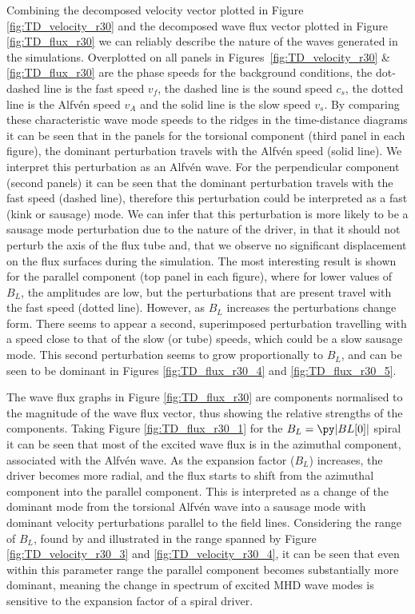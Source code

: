 Combining the decomposed velocity vector plotted in Figure \ref{fig:TD_velocity_r30} and the decomposed wave flux vector plotted in Figure \ref{fig:TD_flux_r30} we can reliably describe the nature of the waves generated in the simulations.
Overplotted on all panels in Figures~\ref{fig:TD_velocity_r30} \& \ref{fig:TD_flux_r30} are the phase speeds for the background conditions, the dot-dashed line is the fast speed $v_f$, the dashed line is the sound speed $c_s$, the dotted line is the Alfv\'en speed $v_A$ and the solid line is the slow speed $v_s$.
By comparing these characteristic wave mode speeds to the ridges in the time-distance diagrams it can be seen that in the panels for the torsional component (third panel in each figure), the dominant perturbation travels with the Alfv\'en speed (solid line).
We interpret this perturbation as an Alfv\'en wave.
For the perpendicular component (second panels) it can be seen that the dominant perturbation travels with the fast speed (dashed line), therefore this perturbation could be interpreted as a fast (kink or sausage) mode.
We can infer that this perturbation is more likely to be a sausage mode perturbation due to the nature of the driver, in that it should not perturb the axis of the flux tube and, that we observe no significant displacement on the flux surfaces during the simulation.
The most interesting result is shown for the parallel component (top panel in each figure), where for lower values of $B_L$, the amplitudes are low, but the perturbations that are present travel with the fast speed (dotted line).
However, as $B_L$ increases the perturbations change form.
There seems to appear a second, superimposed perturbation travelling with a speed close to that of the slow (or tube) speeds, which could be a slow sausage mode.
This second perturbation seems to grow proportionally to $B_L$, and can be seen to be dominant in Figures \ref{fig:TD_flux_r30_4} and \ref{fig:TD_flux_r30_5}.

The wave flux graphs in Figure \ref{fig:TD_flux_r30} are components normalised to the magnitude of the wave flux vector, thus showing the relative strengths of the components.
Taking Figure \ref{fig:TD_flux_r30_1} for the $B_L=\py|BL[0]|$ spiral it can be seen that most of the excited wave flux is in the azimuthal component, associated with the Alfv\'en wave.
As the expansion factor ($B_L$) increases, the driver becomes more radial, and the flux starts to shift from the azimuthal component into the parallel component.
This is interpreted as a change of the dominant mode from the torsional Alfv\'en wave into a sausage mode with dominant velocity perturbations parallel to the field lines.
Considering the range of $B_L$, found by \cite{bonet2008} and illustrated in the range spanned by Figure \ref{fig:TD_velocity_r30_3} and \ref{fig:TD_velocity_r30_4}, it can be seen that even within this parameter range the parallel component becomes substantially more dominant, meaning the change in spectrum of excited MHD wave modes is sensitive to the expansion factor of a spiral driver.

